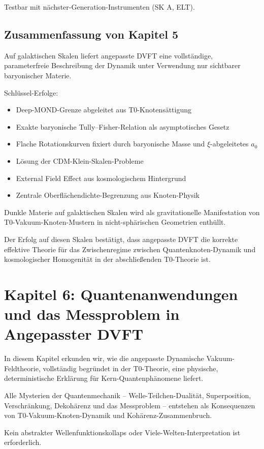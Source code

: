 	Testbar mit nächster-Generation-Instrumenten (SK A, ELT).
	
	\subsection{Zusammenfassung von Kapitel 5}
	
	Auf galaktischen Skalen liefert angepasste DVFT eine vollständige, parameterfreie Beschreibung der Dynamik unter Verwendung nur sichtbarer baryonischer Materie.
	
	Schlüssel-Erfolge:
	\begin{itemize}
		\item Deep-MOND-Grenze abgeleitet aus T0-Knotensättigung
		\item Exakte baryonische Tully–Fisher-Relation als asymptotisches Gesetz
		\item Flache Rotationskurven fixiert durch baryonische Masse und $\xi$-abgeleitetes $a_0$
		\item Lösung der CDM-Klein-Skalen-Probleme
		\item External Field Effect aus kosmologischem Hintergrund
		\item Zentrale Oberflächendichte-Begrenzung aus Knoten-Physik
	\end{itemize}
	
	Dunkle Materie auf galaktischen Skalen wird als gravitationelle Manifestation von T0-Vakuum-Knoten-Mustern in nicht-sphärischen Geometrien enthüllt.
	
	Der Erfolg auf diesen Skalen bestätigt, dass angepasste DVFT die korrekte effektive Theorie für das Zwischenregime zwischen Quantenknoten-Dynamik und kosmologischer Homogenität in der abschließenden T0-Theorie ist.
	
	\section{Kapitel 6: Quantenanwendungen und das Messproblem in Angepasster DVFT}
	
	In diesem Kapitel erkunden wir, wie die angepasste Dynamische Vakuum-Feldtheorie, vollständig begründet in der T0-Theorie, eine physische, deterministische Erklärung für Kern-Quantenphänomene liefert.
	
	Alle Mysterien der Quantenmechanik – Welle-Teilchen-Dualität, Superposition, Verschränkung, Dekohärenz und das Messproblem – entstehen als Konsequenzen von T0-Vakuum-Knoten-Dynamik und Kohärenz-Zusammenbruch.
	
	Kein abstrakter Wellenfunktionskollaps oder Viele-Welten-Interpretation ist erforderlich.
	

